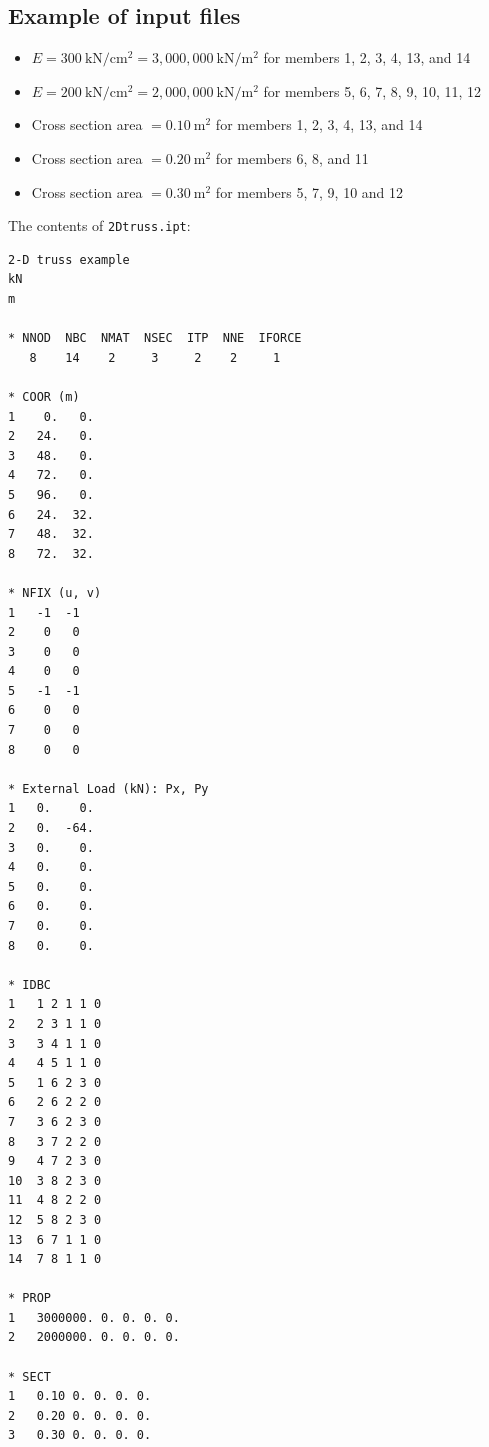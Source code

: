 \subsection*{Example of input files}
\begin{fig}
  
\end{fig}
\begin{itemize}
  \item $E = 300~\mathrm{kN/cm^2} = 3{,}000{,}000~\mathrm{kN/m^2}$ for members 1, 2, 3, 4, 13, and 14
  \item $E = 200~\mathrm{kN/cm^2} = 2{,}000{,}000~\mathrm{kN/m^2}$ for members 5, 6, 7, 8, 9, 10, 11, 12
  \item Cross section area $= 0.10~\mathrm{m^2}$ for members 1, 2, 3, 4, 13, and 14
  \item Cross section area $= 0.20~\mathrm{m^2}$ for members 6, 8, and 11
  \item Cross section area $= 0.30~\mathrm{m^2}$ for members 5, 7, 9, 10 and 12
\end{itemize}
The contents of \texttt{2Dtruss.ipt}:
\begin{lstlisting}[language={},numbers=none,basicstyle=\small\ttfamily]
2-D truss example
kN
m

* NNOD  NBC  NMAT  NSEC  ITP  NNE  IFORCE
   8    14    2     3     2    2     1

* COOR (m)
1    0.   0.
2   24.   0.
3   48.   0.
4   72.   0.
5   96.   0.
6   24.  32.
7   48.  32.
8   72.  32.

* NFIX (u, v)
1   -1  -1
2    0   0
3    0   0
4    0   0
5   -1  -1
6    0   0
7    0   0
8    0   0

* External Load (kN): Px, Py
1   0.    0.
2   0.  -64.
3   0.    0.
4   0.    0.
5   0.    0.
6   0.    0.
7   0.    0.
8   0.    0.

* IDBC
1   1 2 1 1 0
2   2 3 1 1 0
3   3 4 1 1 0
4   4 5 1 1 0
5   1 6 2 3 0
6   2 6 2 2 0
7   3 6 2 3 0
8   3 7 2 2 0
9   4 7 2 3 0
10  3 8 2 3 0
11  4 8 2 2 0
12  5 8 2 3 0
13  6 7 1 1 0
14  7 8 1 1 0

* PROP
1   3000000. 0. 0. 0. 0.
2   2000000. 0. 0. 0. 0.

* SECT
1   0.10 0. 0. 0. 0.
2   0.20 0. 0. 0. 0.
3   0.30 0. 0. 0. 0.
\end{lstlisting}

